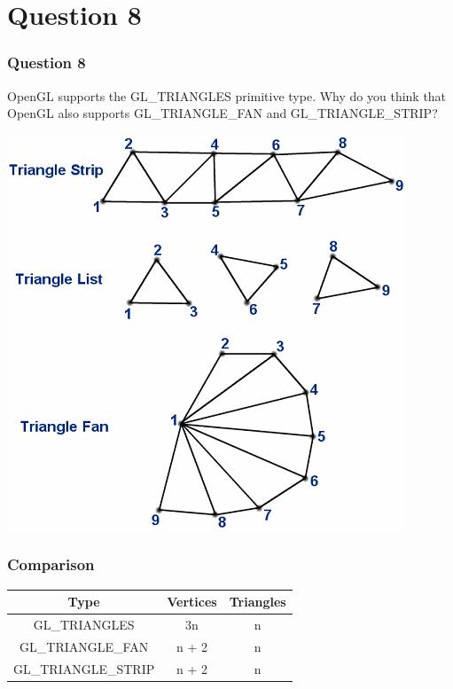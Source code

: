 \documentclass{beamer}
\begin{document}
\section{Question 8}

\begin{frame}
    \frametitle{Question 8}
    OpenGL supports the GL\_TRIANGLES primitive type. Why do you think that OpenGL also
    supports GL\_TRIANGLE\_FAN and GL\_TRIANGLE\_STRIP?

    \begin{center}
        \includegraphics[scale=0.3]{tri-fan-strip.png}
    \end{center}
\end{frame}

\begin{frame}
    \frametitle{Comparison}

    \begin{center}
        \begin{tabular}{|c|c|c|}
            \hline
            Type & Vertices & Triangles\\
            \hline
            GL\_TRIANGLES & 3n & n\\
            GL\_TRIANGLE\_FAN & n + 2 & n\\
            GL\_TRIANGLE\_STRIP & n + 2 & n\\
            \hline
        \end{tabular}
    \end{center}

\end{frame}
\end{document}
